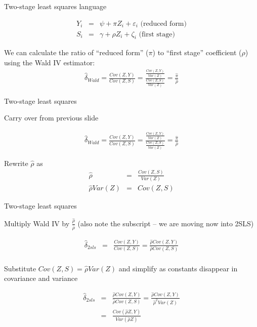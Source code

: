 \documentclass{beamer}
\begin{document}
\begin{frame}{Two-stage least squares language}

		\begin{eqnarray*}
		Y_i&=&\psi + \pi{Z_i} + \varepsilon_i \text{ (reduced form)} \\
		S_i &=& \gamma + \rho{Z}_i + \zeta_i \text{ (first stage)} 
		\end{eqnarray*}
		
		\bigskip
		
We can calculate the ratio of ``reduced form'' ($\pi$) to ``first stage'' coefficient ($\rho$) using the Wald IV estimator:
		\begin{eqnarray*}
		\widehat{\delta}_{Wald} = \frac{ Cov(Z,Y)} {Cov(Z,S)} = \frac{ \frac{Cov(Z,Y)}{Var(Z)}}{ \frac{Cov(Z,S)}{Var(Z)}} = \frac{\widehat{\pi}}{\widehat{\rho}}
		\end{eqnarray*}

\end{frame}



\begin{frame}{Two-stage least squares}

Carry over from previous slide

\bigskip

		\begin{eqnarray*}
		\widehat{\delta}_{Wald} = \frac{ Cov(Z,Y)} {Cov(Z,S)} = \frac{ \frac{Cov(Z,Y)}{Var(Z)}}{ \frac{Cov(Z,S)}{Var(Z)}} = \frac{\widehat{\pi}}{\widehat{\rho}}
		\end{eqnarray*}

\bigskip

Rewrite $\widehat{\rho}$ as\begin{eqnarray*}
	\widehat{\rho} &=&  \frac{Cov(Z,S)}{Var(Z)} \\
\widehat{\rho}Var(Z)	&=& Cov(Z,S) 
	\end{eqnarray*}

\end{frame}


\begin{frame}{Two-stage least squares}

Multiply Wald IV by $\frac{\widehat{\rho}}{\widehat{\rho}}$  (also note the subscript -- we are moving now into 2SLS)

	\begin{eqnarray*}
	\widehat{\delta}_{2sls} &=& \frac{ Cov(Z,Y)}{ Cov(Z,S)} = \frac{\widehat{\rho}Cov(Z,Y)}{\widehat{\rho}Cov(Z,S)} \\
	\end{eqnarray*}

Substitute $Cov(Z,S) = \widehat{\rho}Var(Z) $ and simplify as constants disappear in covariance and variance

	\begin{eqnarray*}
	\widehat{\delta}_{2sls} &=& \frac{\widehat{\rho}Cov(Z,Y)}{\widehat{\rho}Cov(Z,S)} = \frac{\widehat{\rho}Cov(Z,Y)}{\widehat{\rho}^2Var(Z)}  \\
	&=&\frac{Cov(\widehat{\rho}Z,Y)}{Var(\widehat{\rho}Z)} 
	\end{eqnarray*}

\end{frame}
\end{document}
